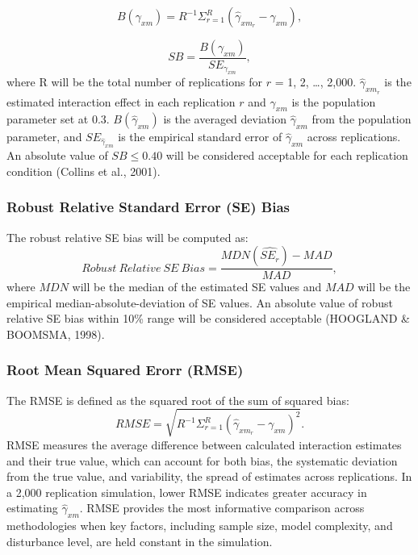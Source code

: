 \documentclass[
  man]{apa6}
\begin{document}
\begin{equation}
B(\gamma_{xm}) = R^{-1}\Sigma^{R}_{r = 1}(\hat{\gamma}_{xm_{r}} - \gamma_{xm}),
\end{equation}

\begin{equation}
SB = \frac{B(\gamma_{xm})}{SE_{\gamma_{xm}}},
\end{equation}
where R will be the total number of replications for \(r\) = 1, 2, \ldots, 2,000. \(\hat{\gamma}_{xm_{r}}\) is the estimated interaction effect in each replication \(r\) and \(\gamma_{xm}\) is the population parameter set at 0.3. \(B(\hat{\gamma}_{xm})\) is the averaged deviation \(\hat{\gamma}_{xm}\) from the population parameter, and \(SE_{\hat{\gamma}_{xm}}\) is the empirical standard error of \(\hat{\gamma}_{xm}\) across replications. An absolute value of \(SB \le 0.40\) will be considered acceptable for each replication condition (Collins et al., 2001).

\hypertarget{robust-relative-standard-error-se-bias}{%
\subsubsection{Robust Relative Standard Error (SE) Bias}\label{robust-relative-standard-error-se-bias}}

The robust relative SE bias will be computed as:
\begin{equation}
Robust\ Relative\ SE\ Bias = \frac{MDN(\widehat{SE_{r}}) - MAD}{MAD},
\end{equation}
where \(MDN\) will be the median of the estimated SE values and \(MAD\) will be the empirical median-absolute-deviation of SE values. An absolute value of robust relative SE bias within 10\% range will be considered acceptable (HOOGLAND \& BOOMSMA, 1998).

\hypertarget{root-mean-squared-erorr-rmse}{%
\subsubsection{Root Mean Squared Erorr (RMSE)}\label{root-mean-squared-erorr-rmse}}

The RMSE is defined as the squared root of the sum of squared bias:
\begin{equation}
RMSE = \sqrt{R^{-1}\Sigma^{R}_{r = 1}(\hat{\gamma}_{xm_{r}} - \gamma_{xm})^2}.
\end{equation}
RMSE measures the average difference between calculated interaction estimates and their true value, which can account for both bias, the systematic deviation from the true value, and variability, the spread of estimates across replications. In a 2,000 replication simulation, lower RMSE indicates greater accuracy in estimating \(\hat{\gamma}_{xm}\). RMSE provides the most informative comparison across methodologies when key factors, including sample size, model complexity, and disturbance level, are held constant in the simulation.
\end{document}
